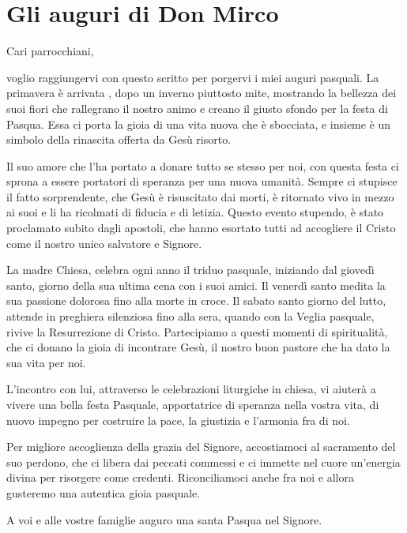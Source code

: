 \section{Gli auguri di Don Mirco}
Cari parrocchiani,

voglio raggiungervi con questo scritto per porgervi i miei auguri pasquali. La primavera è arrivata , dopo un inverno piuttosto mite, mostrando la bellezza dei suoi fiori che rallegrano il nostro animo e creano il giusto sfondo per la festa di Pasqua. Essa ci porta la gioia di una vita nuova che è sbocciata, e insieme è un simbolo della rinascita offerta da Gesù risorto.

Il suo amore che l’ha portato a donare tutto se stesso per noi, con questa festa ci sprona a essere portatori di speranza per una nuova umanità. Sempre ci stupisce il fatto sorprendente, che Gesù è risuscitato dai morti, è ritornato vivo in mezzo ai suoi e li ha ricolmati di fiducia e di letizia. Questo evento stupendo, è stato proclamato subito dagli apostoli, che hanno esortato tutti ad accogliere il Cristo come il nostro unico salvatore e Signore.

La madre Chiesa, celebra ogni anno il triduo pasquale, iniziando dal giovedì santo, giorno della sua ultima cena con i suoi amici. Il venerdì santo medita la sua passione dolorosa fino alla morte in croce. Il sabato santo giorno del lutto, attende in preghiera silenziosa fino alla sera, quando con la Veglia pasquale, rivive la Resurrezione di Cristo. Partecipiamo a questi momenti di spiritualità, che ci donano la gioia di incontrare Gesù, il nostro buon pastore che ha dato la sua vita per noi.

L’incontro con lui, attraverso le celebrazioni liturgiche in chiesa, vi aiuterà a vivere una bella festa Pasquale, apportatrice di speranza nella vostra vita, di nuovo impegno per costruire la pace, la giustizia e l’armonia fra di noi.

Per migliore accoglienza della grazia del Signore, accostiamoci al sacramento del suo perdono, che ci libera dai peccati commessi e ci immette nel cuore un’energia divina per risorgere come credenti. Riconciliamoci anche fra noi e allora gusteremo una autentica gioia pasquale.

A voi e alle vostre famiglie auguro una santa Pasqua nel Signore.

